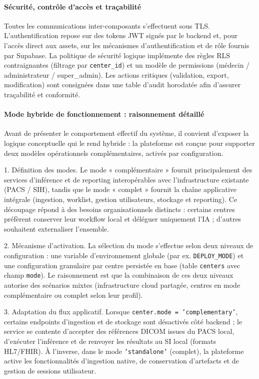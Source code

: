 \paragraph{Sécurité, contrôle d'accès et traçabilité}
Toutes les communications inter-composants s'effectuent sous TLS. L'authentification repose sur des tokens JWT signés par le backend et, pour l'accès direct aux assets, sur les mécanismes d'authentification et de rôle fournis par Supabase. La politique de sécurité logique implémente des règles RLS contraignantes (filtrage par \texttt{center\_id}) et un modèle de permissions (médecin / administrateur / super\_admin). Les actions critiques (validation, export, modification) sont consignées dans une table d'audit horodatée afin d'assurer traçabilité et conformité.

\paragraph{Mode hybride de fonctionnement : raisonnement détaillé}
Avant de présenter le comportement effectif du système, il convient d'exposer la logique conceptuelle qui le rend hybride : la plateforme est conçue pour supporter deux modèles opérationnels complémentaires, activés par configuration.

1. Définition des modes. Le mode « complémentaire » fournit principalement des services d'inférence et de reporting interopérables avec l'infrastructure existante (PACS / SIH), tandis que le mode « complet » fournit la chaîne applicative intégrale (ingestion, worklist, gestion utilisateurs, stockage et reporting). Ce découpage répond à des besoins organisationnels distincts : certains centres préfèrent conserver leur workflow local et déléguer uniquement l'IA ; d'autres souhaitent externaliser l'ensemble.

2. Mécanisme d'activation. La sélection du mode s'effectue selon deux niveaux de configuration : une variable d'environnement globale (par ex. \texttt{DEPLOY\_MODE}) et une configuration granulaire par centre persistée en base (table \texttt{centers} avec champ \texttt{mode}). Le raisonnement est que la combinaison de ces deux niveaux autorise des scénarios mixtes (infrastructure cloud partagée, centres en mode complémentaire ou complet selon leur profil).

3. Adaptation du flux applicatif. Lorsque \texttt{center.mode = 'complementary'}, certains endpoints d'ingestion et de stockage sont désactivés côté backend ; le service se contente d'accepter des références DICOM issues du PACS local, d'exécuter l'inférence et de renvoyer les résultats au SI local (formats HL7/FHIR). À l'inverse, dans le mode \texttt{'standalone'} (complet), la plateforme active les fonctionnalités d'ingestion native, de conservation d'artefacts et de gestion de sessions utilisateur.

